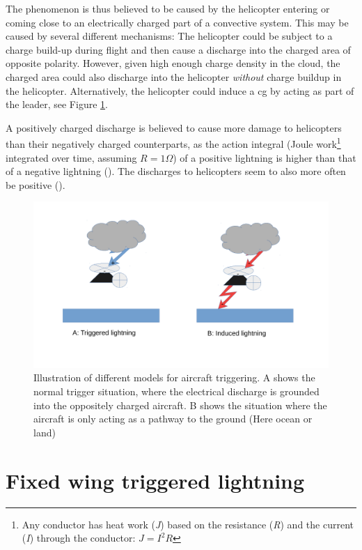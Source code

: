 The phenomenon is thus believed to be caused by the helicopter entering or coming close to an electrically charged part of a convective system. This may be caused by several different mechanisms: The helicopter could be subject to a charge build-up during flight and then cause a discharge into the charged area of opposite polarity. However, given high enough charge density in the cloud, the charged area could also discharge into the helicopter \textit{without} charge buildup in the helicopter. Alternatively, the helicopter could induce a \acrshort{cg} by acting as part of the leader, see Figure \ref{fig:triggertyper}. 

A positively charged discharge is believed to cause more damage to helicopters than their negatively charged counterparts, as the action integral (Joule work\footnote{Any conductor has heat work (\textit{J}) based on the resistance (\textit{R}) and the current (\textit{I}) through the conductor: $J = I^2 R$} integrated over time, assuming $R = 1 \Omega$) of a positive lightning is higher than that of a negative lightning (\cite{hardwick1999}). The discharges to helicopters seem to also more often be positive (\cite{hardwick1999}).

\begin{figure}
    \centering
    \includegraphics[width=\textwidth]{Figures/triggertyper.pdf}
    \caption{Illustration of different models for aircraft triggering. A shows the normal trigger situation, where the electrical discharge is grounded into the oppositely charged aircraft. B shows the situation where the aircraft is only acting as a pathway to the ground (Here ocean or land)}
    \label{fig:triggertyper}
\end{figure}

\section{Fixed wing triggered lightning}\label{sec:fwtl}

